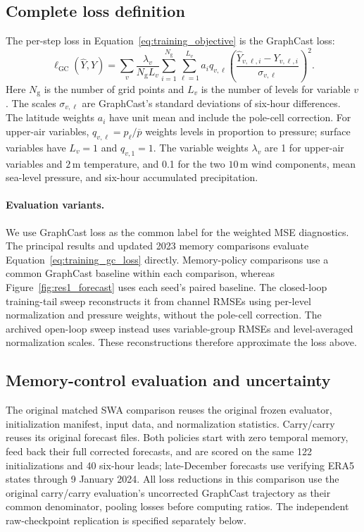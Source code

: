 \documentclass{article}
\newcommand{\vfourchange}[1]{{\color{blue}#1}}
\begin{document}
\subsection{Complete loss definition}
\label{app:training_loss}
The per-step loss in Equation~\ref{eq:training_objective} is the {GraphCast loss}:
\begin{equation}
    \ell_{\mathrm{GC}}(\hat{Y},Y)
    =\sum_v\frac{\lambda_v}{N_{\mathrm{g}}L_v}
      \sum_{i=1}^{N_{\mathrm{g}}}\sum_{\ell=1}^{L_v}
      a_i q_{v,\ell}
      \left(\frac{\hat{Y}_{v,\ell,i}-Y_{v,\ell,i}}
      {\sigma_{v,\ell}}\right)^2.
    \label{eq:training_gc_loss}
\end{equation}
Here $N_{\mathrm{g}}$ is the number of grid points and $L_v$ is the number of levels for variable $v$. The scales $\sigma_{v,\ell}$ are GraphCast's standard deviations of six-hour differences. The latitude weights $a_i$ have unit mean and include the pole-cell correction. For upper-air variables, $q_{v,\ell}=p_\ell/\overline{p}$ weights levels in proportion to pressure; surface variables have $L_v=1$ and $q_{v,1}=1$. The variable weights $\lambda_v$ are 1 for upper-air variables and $2$\,m temperature, and 0.1 for the two $10$\,m wind components, mean sea-level pressure, and six-hour accumulated precipitation.

\paragraph{{Evaluation variants.}}
We use GraphCast loss as the common label for the weighted MSE diagnostics. The principal results \vfourchange{and updated 2023 memory comparisons} evaluate Equation~\ref{eq:training_gc_loss} directly. \vfourchange{Memory-policy comparisons use a common GraphCast baseline within each comparison, whereas Figure~\ref{fig:res1_forecast} uses each seed's paired baseline.} The closed-loop training-tail sweep \vfourchange{reconstructs} it from channel RMSEs using per-level normalization and pressure weights, without the pole-cell correction. The archived open-loop sweep instead uses variable-group RMSEs and level-averaged normalization scales. These reconstructions therefore approximate the loss above.

\subsection{\vfourchange{Memory-control evaluation and uncertainty}}
\label{app:memory_evaluation}

\vfourchange{The original matched SWA comparison reuses the original frozen evaluator, initialization manifest, input data, and normalization statistics. Carry/carry reuses its original forecast files. Both policies start with zero temporal memory, feed back their full corrected forecasts, and are scored on the same 122 initializations and 40 six-hour leads; late-December forecasts use verifying ERA5 states through 9 January 2024. All loss reductions in this comparison use the original carry/carry evaluation's uncorrected GraphCast trajectory as their common denominator, pooling losses before computing ratios. The independent raw-checkpoint replication is specified separately below.}
\end{document}
